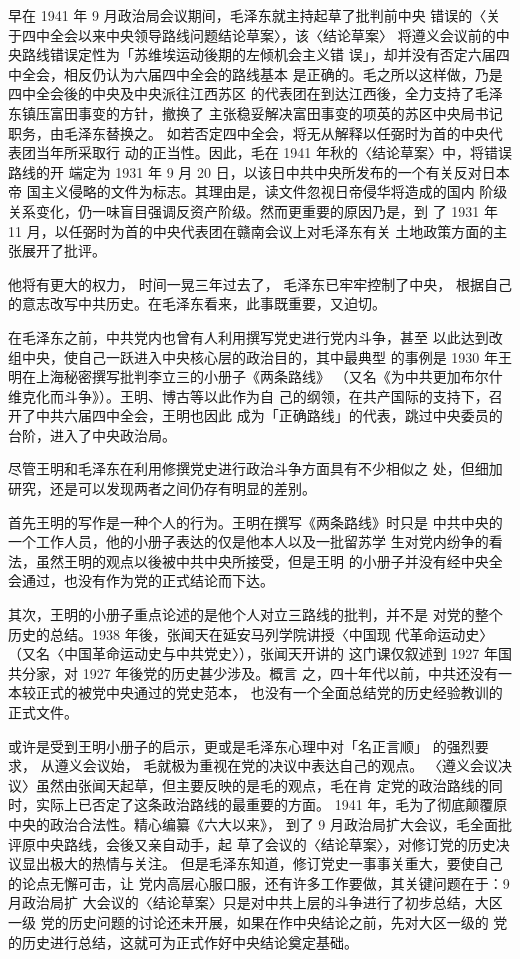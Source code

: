 早在 1941 年 9 月政治局会议期间，毛泽东就主持起草了批判前中央
错误的〈关于四中全会以来中央领导路线问题结论草案〉，该〈结论草案〉
将遵义会议前的中央路线错误定性为「苏维埃运动後期的左倾机会主义错
误」，却并没有否定六届四中全会，相反仍认为六届四中全会的路线基本
是正确的。毛之所以这样做，乃是四中全会後的中央及中央派往江西苏区
的代表团在到达江西後，全力支持了毛泽东镇压富田事变的方针，撤换了
主张稳妥解决富田事变的项英的苏区中央局书记职务，由毛泽东替换之。
如若否定四中全会，将无从解释以任弼时为首的中央代表团当年所采取行
动的正当性。因此，毛在 1941 年秋的〈结论草案〉中，将错误路线的开
端定为 1931 年 9 月 20 日，以该日中共中央所发布的一个有关反对日本帝
国主义侵略的文件为标志。其理由是，读文件忽视日帝侵华将造成的国内
阶级关系变化，仍一味盲目强调反资产阶级。然而更重要的原因乃是，到
了 1931 年 11 月，以任弼时为首的中央代表团在赣南会议上对毛泽东有关
土地政策方面的主张展开了批评。

他将有更大的权力，
时间一晃三年过去了，
毛泽东已牢牢控制了中央，
根据自己的意志改写中共历史。在毛泽东看来，此事既重要，又迫切。

在毛泽东之前，中共党内也曾有人利用撰写党史进行党内斗争，甚至
以此达到改组中央，使自己一跃进入中央核心层的政治目的，其中最典型
的事例是 1930 年王明在上海秘密撰写批判李立三的小册子《两条路线》
（又名《为中共更加布尔什维克化而斗争》）。王明、博古等以此作为自
己的纲领，在共产国际的支持下，召开了中共六届四中全会，王明也因此
成为「正确路线」的代表，跳过中央委员的台阶，进入了中央政治局。

尽管王明和毛泽东在利用修撰党史进行政治斗争方面具有不少相似之
处，但细加研究，还是可以发现两者之间仍存有明显的差别。

首先王明的写作是一种个人的行为。王明在撰写《两条路线》时只是
中共中央的一个工作人员，他的小册子表达的仅是他本人以及一批留苏学
生对党内纷争的看法，虽然王明的观点以後被中共中央所接受，但是王明
的小册子并没有经中央全会通过，也没有作为党的正式结论而下达。

其次，王明的小册子重点论述的是他个人对立三路线的批判，并不是
对党的整个历史的总结。1938 年後，张闻天在延安马列学院讲授〈中国现
代革命运动史〉（又名〈中国革命运动史与中共党史〉），张闻天开讲的
这门课仅叙述到 1927 年国共分家，对 1927 年後党的历史甚少涉及。概言
之，四十年代以前，中共还没有一本较正式的被党中央通过的党史范本，
也没有一个全面总结党的历史经验教训的正式文件。

或许是受到王明小册子的启示，更或是毛泽东心理中对「名正言顺」
的强烈要求，
从遵义会议始，
毛就极为重视在党的决议中表达自己的观点。
〈遵义会议决议〉虽然由张闻天起草，但主要反映的是毛的观点，毛在肯
定党的政治路线的同时，实际上已否定了这条政治路线的最重要的方面。
1941 年，毛为了彻底颠覆原中央的政治合法性。精心编纂《六大以来》，
到了 9 月政治局扩大会议，毛全面批评原中央路线，会後又亲自动手，起
草了会议的〈结论草案〉，对修订党的历史决议显出极大的热情与关注。
但是毛泽东知道，修订党史一事事关重大，要使自己的论点无懈可击，让
党内高层心服口服，还有许多工作要做，其关键问题在于：9 月政治局扩
大会议的〈结论草案〉只是对中共上层的斗争进行了初步总结，大区一级
党的历史问题的讨论还未开展，如果在作中央结论之前，先对大区一级的
党的历史进行总结，这就可为正式作好中央结论奠定基础。

